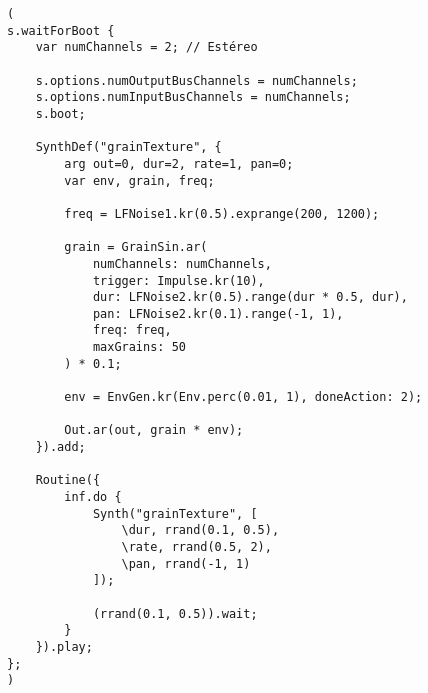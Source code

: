 \begin{minipage}[t]{1\textwidth}
    \centering
    \begin{lstlisting}[style=SuperCollider-IDE, basicstyle=\footnotesize\ttfamily, numbers=none]
(
s.waitForBoot {
    var numChannels = 2; // Estéreo

    s.options.numOutputBusChannels = numChannels;
    s.options.numInputBusChannels = numChannels;
    s.boot;

    SynthDef("grainTexture", {
        arg out=0, dur=2, rate=1, pan=0;
        var env, grain, freq;

        freq = LFNoise1.kr(0.5).exprange(200, 1200);

        grain = GrainSin.ar(
            numChannels: numChannels,
            trigger: Impulse.kr(10),
            dur: LFNoise2.kr(0.5).range(dur * 0.5, dur),
            pan: LFNoise2.kr(0.1).range(-1, 1),
            freq: freq,
            maxGrains: 50
        ) * 0.1;

        env = EnvGen.kr(Env.perc(0.01, 1), doneAction: 2);

        Out.ar(out, grain * env);
    }).add;

    Routine({
        inf.do {
            Synth("grainTexture", [
                \dur, rrand(0.1, 0.5),
                \rate, rrand(0.5, 2),
                \pan, rrand(-1, 1)
            ]);

            (rrand(0.1, 0.5)).wait;
        }
    }).play;
};
)                                      
    \end{lstlisting}
    \vspace{1cm}
\end{minipage}













